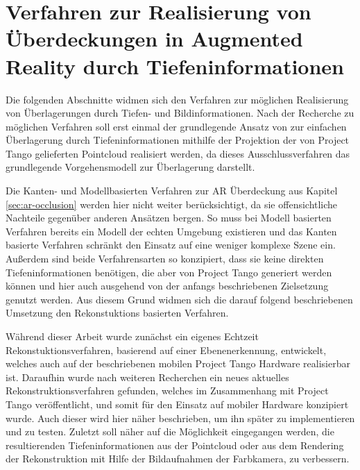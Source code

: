 \chapter{Verfahren zur Realisierung von Überdeckungen in Augmented Reality durch Tiefen\-informationen} \label{sec:optimization}


Die folgenden Abschnitte widmen sich den Verfahren zur möglichen Realisierung von Überlagerungen durch Tiefen- und Bildinformationen. Nach der Recherche zu möglichen Verfahren soll erst einmal der grundlegende Ansatz von \citet{wloka1995resolving} zur einfachen Überlagerung durch Tiefeninformationen mithilfe der Projektion der von Project Tango gelieferten Pointcloud realisiert werden, da dieses Ausschlussverfahren das grundlegende Vorgehensmodell zur Überlagerung darstellt. 

Die Kanten- und Modellbasierten Verfahren zur AR Überdeckung aus Kapitel \ref{sec:ar-occlusion} werden hier nicht weiter berücksichtigt, da sie offensichtliche Nachteile gegenüber anderen Ansätzen bergen. So muss bei Modell basierten Verfahren bereits ein Modell der echten Umgebung existieren und das Kanten basierte Verfahren schränkt den Einsatz auf eine weniger komplexe Szene ein. Außerdem sind beide Verfahrensarten so konzipiert, dass sie keine direkten Tiefeninformationen benötigen, die aber von Project Tango generiert werden können und hier auch ausgehend von der anfangs beschriebenen Zielsetzung genutzt werden. Aus diesem Grund widmen sich die darauf folgend beschriebenen Umsetzung den Rekonstuktions basierten Verfahren.

Während dieser Arbeit wurde zunächst ein eigenes Echtzeit Rekonstuktionsverfahren, basierend auf einer Ebenenerkennung, entwickelt, welches auch auf der beschriebenen mobilen Project Tango Hardware realisierbar ist. Daraufhin wurde nach weiteren Recherchen ein neues aktuelles Rekonstruktionsverfahren gefunden, welches im Zusammenhang mit Project Tango veröffentlicht, und somit für den Einsatz auf mobiler Hardware konzipiert wurde. Auch dieser wird hier näher beschrieben, um ihn später zu implementieren und zu testen. Zuletzt soll näher auf die Möglichkeit eingegangen werden, die resultierenden Tiefeninformationen aus der Pointcloud oder aus dem Rendering der Rekonstruktion mit Hilfe der Bildaufnahmen der Farbkamera, zu verbessern. 









